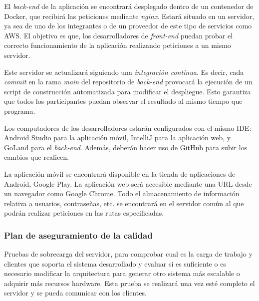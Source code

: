 \documentclass{article}
\begin{document}

El \textit{back-end} de la aplicación se encontrará desplegado dentro de un contenedor de Docker, que recibirá las peticiones mediante \emph{nginx}. Estará situado en un servidor, ya sea de uno de los integrantes o de un proveedor de este tipo de servicios como AWS. El objetivo es que, los desarrolladores de \textit{front-end} puedan probar el correcto funcionamiento de la aplicación realizando peticiones a un mismo servidor.

Este servidor se actualizará siguiendo una \emph{integración continua}. Es decir, cada \textit{commit} en la rama \textit{main} del repositorio de \textit{back-end} provocará la ejecución de un script de construcción automatizada para modificar el despliegue. Esto garantiza que todos los participantes puedan observar el resultado al mismo tiempo que programa.

Los computadores de los desarrolladores estarán configurados con el mismo IDE: Android Studio para la aplicación móvil, IntelliJ para la aplicación web, y GoLand para el \textit{back-end}. Además, deberán hacer uso de GitHub para subir los cambios que realicen.

La aplicación móvil se encontrará disponible en la tienda de aplicaciones de Android, Google Play. La aplicación web será accesible mediante una URL desde un navegador como Google Chrome. Todo el almacenamiento de información relativa a usuarios, contraseñas, etc. se encontrará en el servidor común al que podrán realizar peticiones en las rutas especificadas.


\subsubsection{Plan de aseguramiento de la calidad}


Pruebas de sobrecarga del servidor, para comprobar cual es la carga de trabajo y clientes que soporta el sistema desarrollado y evaluar si es suficiente o es necesario modificar la arquitectura para generar otro sistema más escalable o adquirir más recursos hardware. Esta prueba se realizará una vez esté completo el servidor y se pueda comunicar con los clientes.
\end{document}
